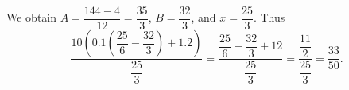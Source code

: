 We obtain $A=\dfrac{144-4}{12}=\dfrac{35}{3}$, $B=\dfrac{32}{3}$, and $x=\dfrac{25}{3}$. Thus
\[\dfrac{10(0.1(\dfrac{25}{6}-\dfrac{32}{3})+1.2)}{\dfrac{25}{3}}=\dfrac{\dfrac{25}{6}-\dfrac{32}{3}+12}{\dfrac{25}{3}}=\dfrac{\dfrac{11}{2}}{\dfrac{25}{3}}=\boxed{\dfrac{33}{50}}.\]
